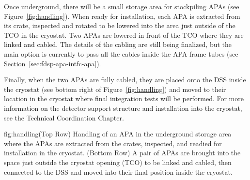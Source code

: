 Once underground, there will be a small storage area for stockpiling APAs (see Figure~\ref{fig:handling}). When ready for installation, each APA is extracted from its crate, inspected and rotated to be lowered into the area just outside of the TCO in the cryostat. Two APAs are lowered in front of the TCO where they are linked and cabled. The details of the cabling are still being finalized, but the main option is currently to pass all the cables inside the APA frame tubes (see Section~\ref{sec:fdsp-apa-intfc-apa}).



Finally, when the two APAs are fully cabled, they are placed onto the DSS inside the cryostat (see bottom right of Figure~\ref{fig:handling}) and moved to their location in the cryostat where final integration tests will be performed.  For more information on the detector support structure and installation into the cryostat, see the Technical Coordination Chapter. 

\begin{dunefigure}{fig:handling}{(Top Row) Handling of an APA in the underground storage area where the APAs are extracted from the crates, inspected, and readied for installation in the cryostat. (Bottom Row) A pair of APAs are brought into the space just outside the cryostat opening (TCO) to be linked and cabled, then connected to the DSS and moved into their final position inside the cryostat.}
\setlength{\fboxsep}{0pt}
\setlength{\fboxrule}{0.5pt}
\centering
{} 
\\ \vspace*{1.5mm}
\hspace*{-.25mm}
\hspace*{1.mm}
\end{dunefigure}

